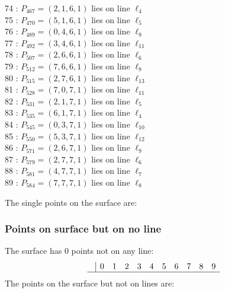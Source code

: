 \documentclass{article}
\begin{document}
{\begin{multicols}{2}
74 : $P_{467}=( 2, 1, 6, 1 )$ lies on line $\ell_{4}$\\
75 : $P_{470}=( 5, 1, 6, 1 )$ lies on line $\ell_{5}$\\
76 : $P_{489}=( 0, 4, 6, 1 )$ lies on line $\ell_{9}$\\
77 : $P_{492}=( 3, 4, 6, 1 )$ lies on line $\ell_{11}$\\
78 : $P_{507}=( 2, 6, 6, 1 )$ lies on line $\ell_{6}$\\
79 : $P_{512}=( 7, 6, 6, 1 )$ lies on line $\ell_{8}$\\
80 : $P_{515}=( 2, 7, 6, 1 )$ lies on line $\ell_{13}$\\
81 : $P_{528}=( 7, 0, 7, 1 )$ lies on line $\ell_{11}$\\
82 : $P_{531}=( 2, 1, 7, 1 )$ lies on line $\ell_{5}$\\
83 : $P_{535}=( 6, 1, 7, 1 )$ lies on line $\ell_{4}$\\
84 : $P_{545}=( 0, 3, 7, 1 )$ lies on line $\ell_{10}$\\
85 : $P_{550}=( 5, 3, 7, 1 )$ lies on line $\ell_{12}$\\
86 : $P_{571}=( 2, 6, 7, 1 )$ lies on line $\ell_{9}$\\
87 : $P_{579}=( 2, 7, 7, 1 )$ lies on line $\ell_{6}$\\
88 : $P_{581}=( 4, 7, 7, 1 )$ lies on line $\ell_{7}$\\
89 : $P_{584}=( 7, 7, 7, 1 )$ lies on line $\ell_{8}$\\
\end{multicols}
The single points on the surface are:\\
\subsubsection*{Points on surface but on no line}
The surface has 0 points not on any line:\\
$$
\begin{array}{r|*{10}{r}}
 & 0 & 1 & 2 & 3 & 4 & 5 & 6 & 7 & 8 & 9\\
\hline
\end{array}
$$
The points on the surface but not on lines are:\\
\begin{multicols}{2}
\noindent
\end{multicols}
}
\end{document}
